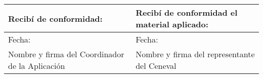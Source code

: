 \documentclass{letter}
\begin{document}
\begin{tabularx}{\textwidth}{|X|X|}  %
    \hline
    \textbf{Recibí de conformidad:} & \textbf{Recibí de conformidad el material aplicado:} \\ \hline
    Fecha: & Fecha: \\ \hline    
    Nombre y firma del Coordinador de la Aplicación & Nombre y firma del representante del Ceneval \\ \hline    
\end{tabularx}
\end{document}
